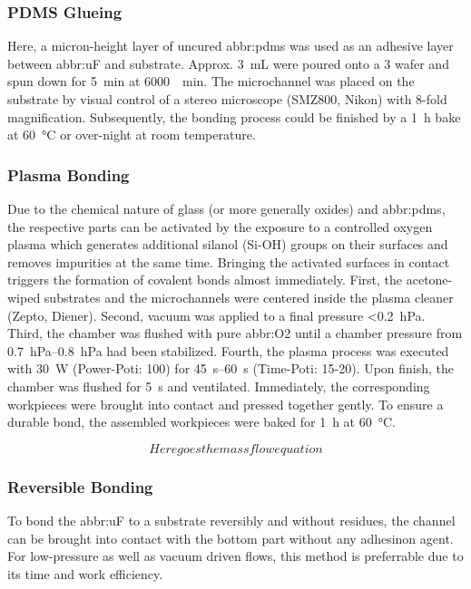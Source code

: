 \subsubsection{PDMS Glueing}
Here, a micron-height layer of uncured \gls{abbr:pdms} was used as an adhesive layer between \gls{abbr:uF} and substrate. Approx. \SI{3}{\milli\liter} were poured onto a \SI{3}{\inch} wafer and spun down for \SI{5}{\minute} at \SI{6000}{\per\minute}. The microchannel was placed on the substrate by visual control of a stereo microscope (SMZ800, Nikon) with 8-fold magnification. Subsequently, the bonding process could be finished by a \SI{1}{\hour} bake at \SI{60}{\degreeCelsius} or over-night at room temperature.
\subsubsection{Plasma Bonding}
Due to the chemical nature of glass (or more generally oxides) and \gls{abbr:pdms}, the respective parts can be activated by the exposure to a controlled oxygen plasma which generates additional silanol (Si-OH) groups on their surfaces and removes impurities at the same time. Bringing the activated surfaces in contact triggers the formation of covalent bonds almost immediately. First, the acetone-wiped substrates and the microchannels were centered inside the plasma cleaner (Zepto, Diener). Second, vacuum was applied to a final pressure <\SI{0.2}{\hecto\pascal}. Third, the chamber was flushed with pure \gls{abbr:O2} until a chamber pressure from \SIrange{0.7}{0.8}{\hecto\pascal} had been stabilized. Fourth, the plasma process was executed with \SI{30}{\watt} (Power-Poti: 100) for \SIrange{45}{60}{\second} (Time-Poti: 15-20). Upon finish, the chamber was flushed for \SI{5}{\second} and ventilated. Immediately, the corresponding workpieces were brought into contact and pressed together gently. To ensure a durable bond, the assembled workpieces were baked for \SI{1}{\hour} at \SI{60}{\degreeCelsius}.

\begin{equation}
	Here goes the mass flow equation
\end{equation}

\subsubsection{Reversible Bonding}
To bond the \gls{abbr:uF} to a substrate reversibly and without residues, the channel can be brought into contact with the bottom part without any adhesinon agent. For low-pressure as well as vacuum driven flows, this method is preferrable due to its time and work efficiency.

